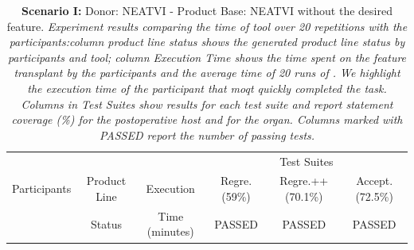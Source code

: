 \begin{table}[t]
\centering 
    \caption{\textbf{Scenario I:} Donor: NEATVI - Product Base: NEATVI without the desired feature. \textit{Experiment results comparing the time of tool over 20 repetitions with the participants:column product line status shows the generated product line status by participants and tool; column \emph{Execution Time} shows the time spent on the feature transplant by the participants and the average time of 20 runs of \prodscalpel. We highlight the execution time of the participant that moqt quickly completed the task. Columns in \emph{Test Suites} show results for each test suite and report statement coverage (\%) for the postoperative host and for the organ. Columns marked with \emph{PASSED} report the number of passing tests.}}
	\label{tab:transplantation_results}
	\begin{tabular}{lcrrrr}\\\hline
		\multicolumn{1}{c}{}       & & & \multicolumn{3}{c}{Test Suites} \\            
		\cline{4-6}  
		 \multicolumn{1}{c}{Participants} & \multicolumn{1}{c}{ Product Line} & \multicolumn{1}{c}{Execution}& \multicolumn{1}{c}{Regre. (59\%)} & \multicolumn{1}{c}{Regre.++ (70.1\%)} & \multicolumn{1}{c}{Accept. (72.5\%)} \\
		\multicolumn{1}{c}{} & \multicolumn{1}{c}{Status} & \multicolumn{1}{c}{Time (minutes)} & \multicolumn{1}{c}{PASSED}  & \multicolumn{1}{c}{PASSED}  & \multicolumn{1}{c}{PASSED} \\\hline


\end{tabular}
\end{table}
